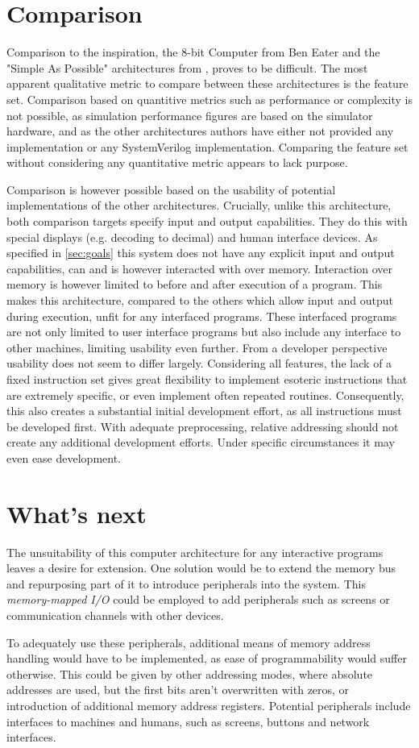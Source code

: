 \section{Comparison}
Comparison to the inspiration, the 8-bit Computer from Ben Eater \cite{beneater} and the "Simple As Possible" architectures from \cite{malvino1983a}, proves to be difficult. The most apparent qualitative metric to compare between these architectures is the feature set. Comparison based on quantitive metrics such as performance or complexity is not possible, as simulation performance figures are based on the simulator hardware, and as the other architectures authors have either not provided any implementation or any SystemVerilog implementation. Comparing the feature set without considering any quantitative metric appears to lack purpose.

Comparison is however possible based on the usability of potential implementations of the other architectures. Crucially, unlike this architecture, both comparison targets specify input and output capabilities. They do this with special displays (e.g. decoding to decimal) and human interface devices. As specified in \ref{sec:goals} this system does not have any explicit input and output capabilities, can and is however interacted with over memory. Interaction over memory is however limited to before and after execution of a program. This makes this architecture, compared to the others which allow input and output during execution, unfit for any interfaced programs. These interfaced programs are not only limited to user interface programs but also include any interface to other machines, limiting usability even further.
\pagebreak
From a developer perspective usability does not seem to differ largely. Considering all features, the lack of a fixed instruction set gives great flexibility to implement esoteric instructions that are extremely specific, or even implement often repeated routines. Consequently, this also creates a substantial initial development effort, as all instructions must be developed first. With adequate preprocessing, relative addressing should not create any additional development efforts. Under specific circumstances it may even ease development.

\section{What's next}
The unsuitability of this computer architecture for any interactive programs leaves a desire for extension. One solution would be to extend the memory bus and repurposing part of it to introduce peripherals into the system. This \textit{memory-mapped I/O} could be employed to add peripherals such as screens or communication channels with other devices. 

To adequately use these peripherals, additional means of memory address handling would have to be implemented, as ease of programmability would suffer otherwise. This could be given by other addressing modes, where absolute addresses are used, but the first bits aren't overwritten with zeros, or introduction of additional memory address registers. Potential peripherals include interfaces to machines and humans, such as screens, buttons and network interfaces.


